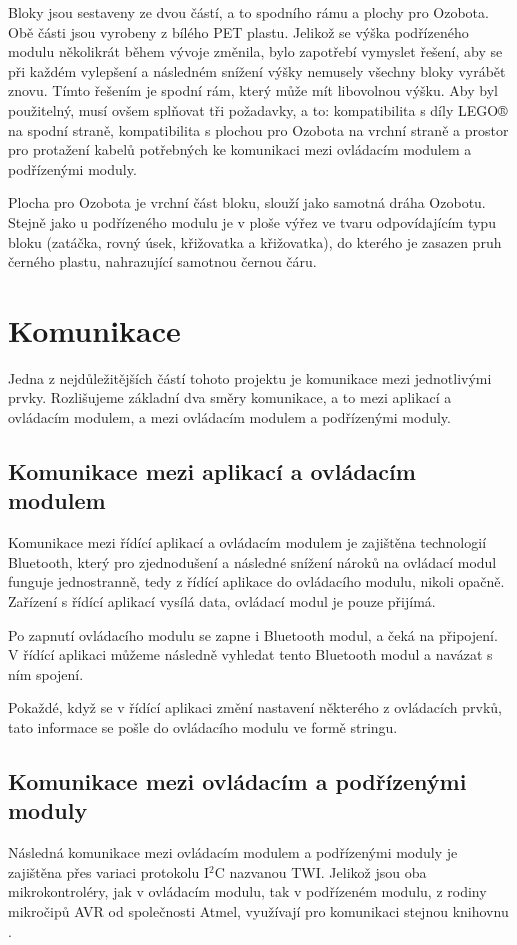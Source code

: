         Bloky jsou sestaveny ze dvou částí, a to spodního rámu a plochy pro Ozobota. Obě části jsou vyrobeny z bílého PET plastu. Jelikož se výška podřízeného modulu několikrát během vývoje změnila, bylo zapotřebí vymyslet řešení, aby se při každém vylepšení a následném snížení výšky nemusely všechny bloky vyrábět znovu. Tímto řešením je spodní rám, který může mít libovolnou výšku. Aby byl použitelný, musí ovšem splňovat tři požadavky, a to: kompatibilita s díly LEGO® na spodní straně, kompatibilita s plochou pro Ozobota na vrchní straně a prostor pro protažení kabelů potřebných ke komunikaci mezi ovládacím modulem a podřízenými moduly.

        Plocha pro Ozobota je vrchní část bloku, slouží jako samotná dráha Ozobotu. Stejně jako u podřízeného modulu je v ploše výřez ve tvaru odpovídajícím typu bloku (zatáčka, rovný úsek, křižovatka  a křižovatka), do kterého je zasazen pruh černého plastu, nahrazující samotnou černou čáru.

    \section{Komunikace}
            Jedna z nejdůležitějších částí tohoto projektu je komunikace mezi jednotlivými prvky. Rozlišujeme základní dva směry komunikace, a to mezi aplikací a ovládacím modulem, a mezi ovládacím modulem a podřízenými moduly.
        \subsection{Komunikace mezi aplikací a ovládacím modulem}
            Komunikace mezi řídící aplikací a ovládacím modulem je zajištěna technologií Bluetooth, který pro zjednodušení a následné snížení nároků na ovládací modul funguje jednostranně, tedy z řídící aplikace do ovládacího modulu, nikoli opačně. Zařízení s řídící aplikací vysílá data, ovládací modul je pouze přijímá.
            
            Po zapnutí ovládacího modulu se zapne i Bluetooth modul, a čeká na připojení. V řídící aplikaci můžeme následně vyhledat tento Bluetooth modul a navázat s ním spojení.

            Pokaždé, když se v řídící aplikaci změní nastavení některého z ovládacích prvků, tato informace se pošle do ovládacího modulu ve formě stringu. 
        \subsection{Komunikace mezi ovládacím a podřízenými moduly}
            Následná komunikace mezi ovládacím modulem a podřízenými moduly je zajištěna přes variaci protokolu I${^2}$C nazvanou TWI. Jelikož jsou oba mikrokontroléry, jak v ovládacím modulu, tak v podřízeném modulu, z rodiny mikročipů AVR od společnosti Atmel, využívají pro komunikaci stejnou knihovnu . 

